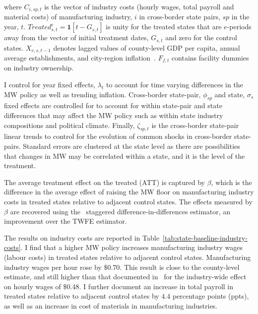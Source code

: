 \documentclass[authoryear, preprint, twocolumn, 1p]{elsarticle}
\begin{document}
    where $C_{i,sp,t}$ is the vector of industry costs (hourly wages, total payroll and material costs) of manufacturing industry, $i$ in cross-border state pairs, $sp$ in the year, $t$. $Treated_{s,t}^e = \textbf{1}[t - G_{s,t}]$ is unity for the treated states that are $e$-periods away from the vector of initial treatment dates, $G_{s,t}$ and zero for the control states. $X_{v,s,t-1}$ denotes lagged values of county-level GDP per capita, annual average establishments, and city-region inflation~\citep{gopalan2021state, dube2010minimum, clemens2019making}. $F_{f,t}$ contains facility dummies on industry ownership.

    I control for year fixed effects, $\lambda_{t}$ to account for time varying differences in the MW policy as well as trending inflation. Cross-border state-pair, $\phi_{sp}$ and state, $\sigma_{s}$ fixed effects are controlled for to account for within state-pair and state differences that may affect the MW policy such as within state industry compositions and political climate. Finally, $\zeta_{sp,t}$ is the cross-border state-pair linear trends to control for the evolution of common shocks in cross-border state-pairs. Standard errors are clustered at the state level as there are possibilities that changes in MW may be correlated within a state, and it is the level of the treatment.
    

    The average treatment effect on the treated (ATT) is captured by $\beta$, which is the difference in the average effect of raising the MW floor on manufacturing industry costs in treated states relative to adjacent control states. The effects measured by $\beta$ are recovered using the~\citet{sun2021estimating} staggered difference-in-differences estimator, an improvement over the TWFE estimator.

    The results on industry costs are reported in Table~\ref{tab:state-baseline-industry-costs}. I find that a higher MW policy increases manufacturing industry wages (labour costs) in treated states relative to adjacent control states. Manufacturing industry wages per hour rose by $\$0.70$. This result is close to the county-level estimate, and still higher than that documented in~\citet{gopalan2021state} for the industry-wide effect on hourly wages of $\$0.48$. I further document an increase in total payroll in treated states relative to adjacent control states by $4.4$ percentage points (ppts), as well as an increase in cost of materials in manufacturing industries.
\end{document}
